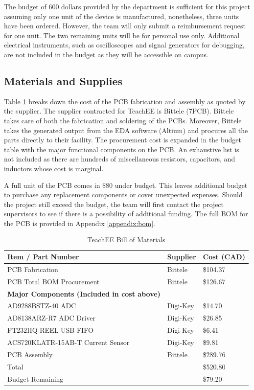 \documentclass[letterpaper,12pt]{article}
\begin{document}
The budget of 600 dollars provided by the department is sufficient for this
project assuming only one unit of the device is manufactured, nonetheless,
three units have been ordered. However, the team will only submit a reimbursement
request for one unit. The two remaining units will be for personal use only.
Additional electrical instruments, such as oscilloscopes
and signal generators for debugging, are not included in the budget as they will be
accessible on campus.

\subsection{Materials and Supplies}
Table \ref{tab:abbreviated-bom} breaks down the cost of the PCB
fabrication and assembly as quoted by the supplier. The supplier contracted for
TeachEE is Bittele (7PCB). Bittele takes care of both the fabrication and
soldering of the PCBs. Moreover, Bittele takes the generated output from the EDA
software (Altium) and procures all the parts directly to their facility. The
procurement cost is expanded in the budget table with the major functional
components on the PCB. An exhaustive list is not included as there are hundreds
of miscellaneous resistors, capacitors, and inductors whose cost is marginal.

A full unit of the PCB comes in \$80 under budget. This leaves
additional budget to purchase any replacement components or
cover unexpected expenses. Should the project still exceed the budget, the team
will first contact the project supervisors to see if there is a possibility of
additional funding. The full BOM for the PCB is provided in
Appendix \ref{appendix:bom}.

\begin{table}[H]
    \caption{TeachEE Bill of Materials}
    \begin{tabularx}{\textwidth}{l|l|l}
        \textbf{Item / Part Number} & \textbf{Supplier} & \textbf{Cost (CAD)} \\
        \hline
        PCB Fabrication & Bittele & \$104.37\\
        PCB Total BOM Procurement & Bittele & \$126.67\\
        \hline
        \textbf{Major Components (Included in cost above)}& &\\
        \hline
        AD9288BSTZ-40 ADC & Digi-Key & \$14.70\\
        AD8138ARZ-R7 ADC Driver & Digi-Key & \$26.85\\
        FT232HQ-REEL USB FIFO & Digi-Key & \$6.41\\
        ACS720KLATR-15AB-T Current Sensor & Digi-Key & \$9.81\\
        \hline
        PCB Assembly & Bittele & \$289.76\\
        \hline
        Total & & \$520.80\\
        \hline
        Budget Remaining & & \$79.20
    \end{tabularx} 
\label{tab:abbreviated-bom}
\end{table}
\end{document}
